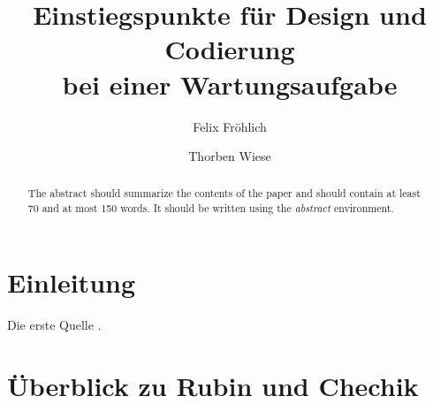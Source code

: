 \documentclass[runningheads,a4paper]{llncs}
\begin{document}
\title{Einstiegspunkte für Design und Codierung \\bei einer Wartungsaufgabe}


\author{Felix Fröhlich \and Thorben Wiese}



\maketitle

\begin{abstract}
The abstract should summarize the contents of the paper and should
contain at least 70 and at most 150 words. It should be written using the
\emph{abstract} environment.
\end{abstract}

\section{Einleitung}

Die erste Quelle \cite{survey}.

\section{Überblick  zu Rubin und Chechik}
\end{document}
